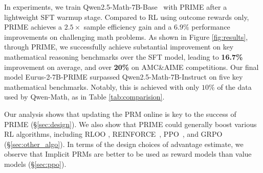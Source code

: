 \iffalse
 \setlength{\itemindent}{-2em}
\begin{itemize}
  \item RQ1: How to provide dense rewards in reinforcement learning remains underexplored.
  
  A: Utilizing token-level rewards directly in advantage/return estimation, rather than values.
  \item RQ2: PRM online update is unscalable given costly process labels.
  
  A: Adopting Implicit PRMs which can be online updated with only policy rollouts and outcome labels.
  \item RQ3: The explicit reward modeling stage consumes a huge amount of data.
  
  A: Using the SFT model as the initialization of the Implicit PRM, which not only bypasses the reward modeling but also improves training performance.
  
\end{itemize}

This is based on three benefits Implicit PRM brings:
(1) \textbf{Dense Reward:} Implicit PRM directly learns a Q-function and provides rewards for \textit{each token}, which alleviates the reward sparsity issue without the need for an extra value model; 
(3) \textbf{Scalability:} Implicit PRM can be online updated with only outcome labels. Therefore, we can directly update the PRM with on-policy rollouts given outcome verifiers, which mitigates the distribution shift as well as scalability issues for PRMs. 
(3) \textbf{Simplicity:} Implicit PRM is inherently a language model. Therefore, it is unnecessary to train a PRM beforehand since the SFT model itself already serves as a strong starting point.
\fi



In experiments, we train Qwen2.5-Math-7B-Base~\citep{yang2024qwen25mathtechnicalreportmathematical} with PRIME after a lightweight SFT warmup stage. Compared to RL using outcome rewards only, PRIME achieves a $2.5\times$ sample efficiency gain and a $6.9\%$ performance improvements on challenging math problems.
As shown in Figure \ref{fig:results}, through PRIME, we successfully achieve substantial improvement on key mathematical reasoning benchmarks over the SFT model, leading to \textbf{16.7\%} improvement on average, and over \textbf{20\%} on AMC\&AIME competitions. Our final model Eurus-2-7B-PRIME surpassed Qwen2.5-Math-7B-Instruct on five key mathematical benchmarks. 
Notably, this is achieved with only $10\%$ of the data used by Qwen-Math, as in Table \ref{tab:comparision}.


Our analysis shows that updating the PRM online is key to the success of PRIME (\S \ref{sec:design}).
We also show that PRIME could generally boost various RL algorithms, including RLOO \citep{ahmadian2024back}, REINFORCE~\citep{williams1992simple}, PPO~\citep{schulman2017proximal}, and GRPO~\citep{deepseek-math} (\S \ref{sec:other_algo}). 
In terms of the design choices of advantage estimate, 
we observe that Implicit PRMs are better to be used as reward models than value models (\S \ref{sec:ppo}).


